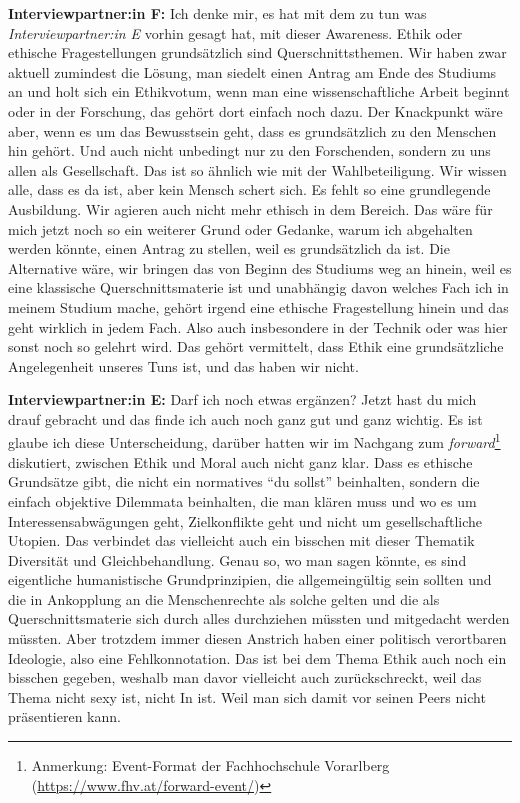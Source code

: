 \documentclass[a4paper,12pt,twoside]{scrreprt}
\begin{document}
\textbf{Interviewpartner:in F:} Ich denke mir, es hat mit dem zu tun was \textit{Interviewpartner:in E} vorhin gesagt hat, mit dieser Awareness. Ethik oder ethische Fragestellungen grundsätzlich sind Querschnittsthemen. Wir haben zwar aktuell zumindest die Lösung, man siedelt einen Antrag am Ende des Studiums an und holt sich ein Ethikvotum, wenn man eine wissenschaftliche Arbeit beginnt oder in der Forschung, das gehört dort einfach noch dazu. Der Knackpunkt wäre aber, wenn es um das Bewusstsein geht, dass es grundsätzlich zu den Menschen hin gehört. Und auch nicht unbedingt nur zu den Forschenden, sondern zu uns allen als Gesellschaft. Das ist so ähnlich wie mit der Wahlbeteiligung. Wir wissen alle, dass es da ist, aber kein Mensch schert sich. Es fehlt so eine grundlegende Ausbildung. Wir agieren auch nicht mehr ethisch in dem Bereich. Das wäre für mich jetzt noch so ein weiterer Grund oder Gedanke, warum ich abgehalten werden könnte, einen Antrag zu stellen, weil es grundsätzlich da ist. Die Alternative wäre, wir bringen das von Beginn des Studiums weg an hinein, weil es eine klassische Querschnittsmaterie ist und unabhängig davon welches Fach ich in meinem Studium mache, gehört irgend eine ethische Fragestellung hinein und das geht wirklich in jedem Fach. Also auch insbesondere in der Technik oder was hier sonst noch so gelehrt wird. Das gehört vermittelt, dass Ethik eine grundsätzliche Angelegenheit unseres Tuns ist, und das haben wir nicht.

\textbf{Interviewpartner:in E:} Darf ich noch etwas ergänzen? Jetzt hast du mich drauf gebracht und das finde ich auch noch ganz gut und ganz wichtig. Es ist glaube ich diese Unterscheidung, darüber hatten wir im Nachgang zum \textit{forward}\footnote{Anmerkung: Event-Format der Fachhochschule Vorarlberg (\url{https://www.fhv.at/forward-event/})} diskutiert, zwischen Ethik und Moral auch nicht ganz klar. Dass es ethische Grundsätze gibt, die nicht ein normatives \enquote{du sollst} beinhalten, sondern die einfach objektive Dilemmata beinhalten, die man klären muss und wo es um Interessensabwägungen geht, Zielkonflikte geht und nicht um gesellschaftliche Utopien. Das verbindet das vielleicht auch ein bisschen mit dieser Thematik Diversität und Gleichbehandlung. Genau so, wo man sagen könnte, es sind eigentliche humanistische Grundprinzipien, die allgemeingültig sein sollten und die in Ankopplung an die Menschenrechte als solche gelten und die als Querschnittsmaterie sich durch alles durchziehen müssten und mitgedacht werden müssten. Aber trotzdem immer diesen Anstrich haben einer politisch verortbaren Ideologie, also eine Fehlkonnotation. Das ist bei dem Thema Ethik auch noch ein bisschen gegeben, weshalb man davor vielleicht auch zurückschreckt, weil das Thema nicht sexy ist, nicht In ist. Weil man sich damit vor seinen Peers nicht präsentieren kann.
\end{document}
